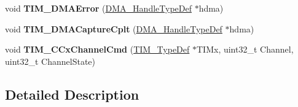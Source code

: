 \begin{DoxyCompactItemize}
void {\bfseries T\+I\+M\+\_\+\+D\+M\+A\+Error} (\mbox{\hyperlink{group___d_m_a___exported___types_ga41b754a906b86bce54dc79938970138b}{D\+M\+A\+\_\+\+Handle\+Type\+Def}} $\ast$hdma)
\item 
\mbox{\label{group___t_i_m___private___functions_ga60b9c315720fddb3db32299f05f7d712}} 
void {\bfseries T\+I\+M\+\_\+\+D\+M\+A\+Capture\+Cplt} (\mbox{\hyperlink{group___d_m_a___exported___types_ga41b754a906b86bce54dc79938970138b}{D\+M\+A\+\_\+\+Handle\+Type\+Def}} $\ast$hdma)
\item 
\mbox{\label{group___t_i_m___private___functions_ga7fcc6d5ca311c37f5d0250687c899924}} 
void {\bfseries T\+I\+M\+\_\+\+C\+Cx\+Channel\+Cmd} (\mbox{\hyperlink{struct_t_i_m___type_def}{T\+I\+M\+\_\+\+Type\+Def}} $\ast$T\+I\+Mx, uint32\+\_\+t Channel, uint32\+\_\+t Channel\+State)
\end{DoxyCompactItemize}


\subsection{Detailed Description}
